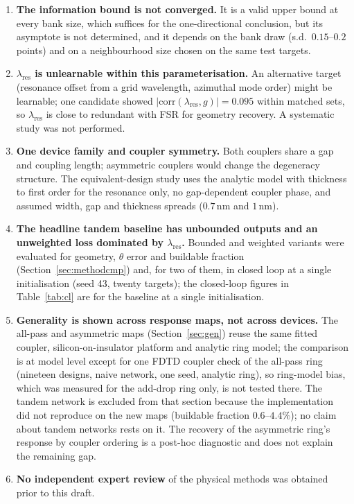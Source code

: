 \documentclass[11pt]{article}
\newcommand{\lres}{\lambda_{\mathrm{res}}}
\begin{document}
\begin{enumerate}[leftmargin=1.6em,itemsep=3pt]
\item \textbf{The information bound is not converged.} It is a valid upper bound at every bank size, which suffices for the one-directional conclusion, but its asymptote is not determined, and it depends on the bank draw (s.d.\ $0.15$--$0.2$ points) and on a neighbourhood size chosen on the same test targets.
\item \textbf{$\lres$ is unlearnable within this parameterisation.} An alternative target (resonance offset from a grid wavelength, azimuthal mode order) might be learnable; one candidate showed $|\mathrm{corr}(\lres, g)| = 0.095$ within matched sets, so $\lres$ is close to redundant with FSR for geometry recovery. A systematic study was not performed.
\item \textbf{One device family and coupler symmetry.} Both couplers share a gap and coupling length; asymmetric couplers would change the degeneracy structure. The equivalent-design study uses the analytic model with thickness to first order for the resonance only, no gap-dependent coupler phase, and assumed width, gap and thickness spreads ($0.7$\,nm and $1$\,nm).
\item \textbf{The headline tandem baseline has unbounded outputs and an unweighted loss dominated by $\lres$.} Bounded and weighted variants were evaluated for geometry, $\theta$ error and buildable fraction (Section~\ref{sec:methodcmp}) and, for two of them, in closed loop at a single initialisation (seed 43, twenty targets); the closed-loop figures in Table~\ref{tab:cl} are for the baseline at a single initialisation.
\item \textbf{Generality is shown across response maps, not across devices.} The all-pass and asymmetric maps (Section~\ref{sec:gen}) reuse the same fitted coupler, silicon-on-insulator platform and analytic ring model; the comparison is at model level except for one FDTD coupler check of the all-pass ring (nineteen designs, naive network, one seed, analytic ring), so ring-model bias, which was measured for the add-drop ring only, is not tested there. The tandem network is excluded from that section because the implementation did not reproduce on the new maps (buildable fraction $0.6$--$4.4\%$); no claim about tandem networks rests on it. The recovery of the asymmetric ring's response by coupler ordering is a post-hoc diagnostic and does not explain the remaining gap.\item \textbf{No independent expert review} of the physical methods was obtained prior to this draft.
\end{enumerate}
\end{document}
